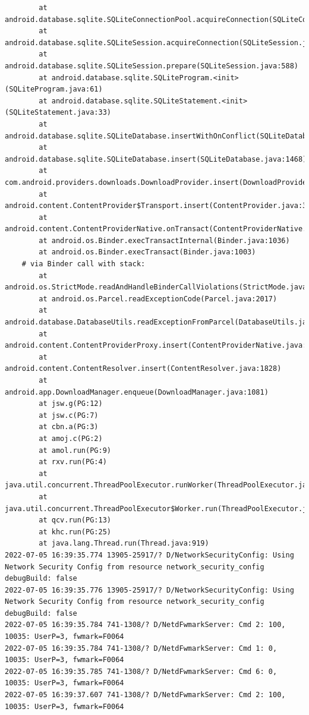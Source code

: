 \documentclass[a4paper,12pt]{book}
\begin{document}
\begin{lstlisting}
        at android.database.sqlite.SQLiteConnectionPool.acquireConnection(SQLiteConnectionPool.java:380)
        at android.database.sqlite.SQLiteSession.acquireConnection(SQLiteSession.java:896)
        at android.database.sqlite.SQLiteSession.prepare(SQLiteSession.java:588)
        at android.database.sqlite.SQLiteProgram.<init>(SQLiteProgram.java:61)
        at android.database.sqlite.SQLiteStatement.<init>(SQLiteStatement.java:33)
        at android.database.sqlite.SQLiteDatabase.insertWithOnConflict(SQLiteDatabase.java:1597)
        at android.database.sqlite.SQLiteDatabase.insert(SQLiteDatabase.java:1468)
        at com.android.providers.downloads.DownloadProvider.insert(DownloadProvider.java:972)
        at android.content.ContentProvider$Transport.insert(ContentProvider.java:309)
        at android.content.ContentProviderNative.onTransact(ContentProviderNative.java:154)
        at android.os.Binder.execTransactInternal(Binder.java:1036)
        at android.os.Binder.execTransact(Binder.java:1003)
    # via Binder call with stack:
        at android.os.StrictMode.readAndHandleBinderCallViolations(StrictMode.java:2289)
        at android.os.Parcel.readExceptionCode(Parcel.java:2017)
        at android.database.DatabaseUtils.readExceptionFromParcel(DatabaseUtils.java:137)
        at android.content.ContentProviderProxy.insert(ContentProviderNative.java:481)
        at android.content.ContentResolver.insert(ContentResolver.java:1828)
        at android.app.DownloadManager.enqueue(DownloadManager.java:1081)
        at jsw.g(PG:12)
        at jsw.c(PG:7)
        at cbn.a(PG:3)
        at amoj.c(PG:2)
        at amol.run(PG:9)
        at rxv.run(PG:4)
        at java.util.concurrent.ThreadPoolExecutor.runWorker(ThreadPoolExecutor.java:1167)
        at java.util.concurrent.ThreadPoolExecutor$Worker.run(ThreadPoolExecutor.java:641)
        at qcv.run(PG:13)
        at khc.run(PG:25)
        at java.lang.Thread.run(Thread.java:919)
2022-07-05 16:39:35.774 13905-25917/? D/NetworkSecurityConfig: Using Network Security Config from resource network_security_config debugBuild: false
2022-07-05 16:39:35.776 13905-25917/? D/NetworkSecurityConfig: Using Network Security Config from resource network_security_config debugBuild: false
2022-07-05 16:39:35.784 741-1308/? D/NetdFwmarkServer: Cmd 2: 100, 10035: UserP=3, fwmark=F0064
2022-07-05 16:39:35.784 741-1308/? D/NetdFwmarkServer: Cmd 1: 0, 10035: UserP=3, fwmark=F0064
2022-07-05 16:39:35.785 741-1308/? D/NetdFwmarkServer: Cmd 6: 0, 10035: UserP=3, fwmark=F0064
2022-07-05 16:39:37.607 741-1308/? D/NetdFwmarkServer: Cmd 2: 100, 10035: UserP=3, fwmark=F0064

\end{lstlisting}
\end{document}
